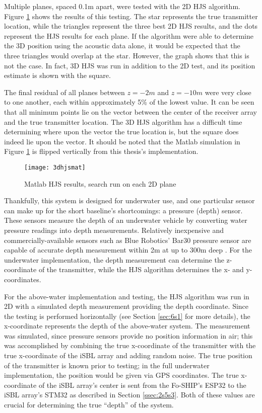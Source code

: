 \documentclass[12pt,a4paper]{report}
\begin{document}
Multiple planes, spaced 0.1m apart, were tested with the 2D HJS algorithm. Figure \ref{fig:3dhjsmat} shows the results of this testing. The star represents the true transmitter location, while the triangles represent the three best 2D HJS results, and the dots represent the HJS results for each plane. If the algorithm were able to determine the 3D position using the acoustic data alone, it would be expected that the three triangles would overlap at the star. However, the graph shows that this is not the case. In fact, 3D HJS was run in addition to the 2D test, and its position estimate is shown with the square.

The final residual of all planes between \(z = -2m\) and \(z = -10m\) were very close to one another, each within approximately 5\% of the lowest value.  It can be seen that all minimum points lie on the vector between the center of the receiver array and the true transmitter location. The 3D HJS algorithm has a difficult time determining where upon the vector the true location is, but the square does indeed lie upon the vector. It should be noted that the Matlab simulation in Figure \ref{fig:3dhjsmat} is flipped vertically from this thesis’s implementation.

\begin{figure}[htbp]
	\centering
	\texttt{[image: 3dhjsmat]}
	\caption{Matlab HJS results, search run on each 2D plane}
	\label{fig:3dhjsmat}
\end{figure}

Thankfully, this system is designed for underwater use, and one particular sensor can make up for the short baseline’s shortcomings: a pressure (depth) sensor. These sensors measure the depth of an underwater vehicle by converting water pressure readings into depth measurements. Relatively inexpensive and commercially-available sensors such as Blue Robotics’ Bar30 pressure sensor are capable of accurate depth measurement within 2m at up to 300m deep \cite{blueps}. For the underwater implementation, the depth measurement can determine the z-coordinate of the transmitter, while the HJS algorithm determines the x- and y-coordinates.

\pagebreak

For the above-water implementation and testing, the HJS algorithm was run in 2D with a simulated depth measurement providing the depth coordinate. Since the testing is performed horizontally (see Section \ref{sec:6s1} for more details), the x-coordinate represents the depth of the above-water system. The measurement was simulated, since pressure sensors provide no position information in air; this was accomplished by combining the true x-coordinate of the transmitter with the true x-coordinate of the iSBL array and adding random noise. The true position of the transmitter is known prior to testing; in the full underwater implementation, the position would be given via GPS coordinates. The true x-coordinate of the iSBL array’s center is sent from the Fo-SHIP’s ESP32 to the iSBL array’s STM32 as described in Section \ref{ssec:2s5s3}. Both of these values are crucial for determining the true “depth” of the system.
\end{document}
